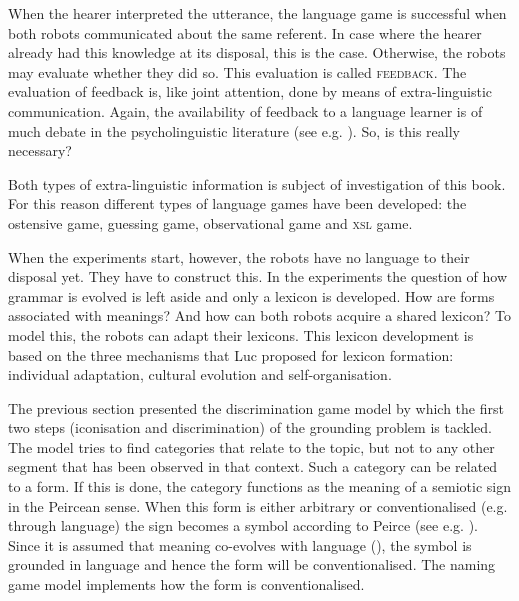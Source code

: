 When the hearer interpreted the utterance, the language game is successful when both robots communicated about the same referent. In case where the hearer already had this knowledge at its disposal, this is the case. Otherwise, the robots may evaluate whether they did so. This evaluation is called {\scshape feedback}. The evaluation of feedback is, like joint attention, done by means of extra-linguistic communication. Again, the availability of feedback to a language learner is of much debate in the psycholinguistic literature (see e.g. \citealt{bowerman:1988}). So, is this really necessary? 

Both types of extra-linguistic information is subject of investigation of this book. For this reason different types of language games have been developed: the ostensive game, guessing game, observational game and {\scshape xsl} game.

When the experiments start, however, the robots have no language to their disposal yet. They have to construct this. In the experiments the question of how grammar is evolved is left aside and only a lexicon is developed. How are forms associated with meanings? And how can both robots acquire a shared lexicon? To model this, the robots can adapt their lexicons. This lexicon development is based on the three mechanisms that Luc \citet{steels:1996a} proposed for lexicon formation: individual adaptation, cultural evolution and self-organisation.

The previous section presented the discrimination game model by which the first two steps (iconisation and discrimination) of the grounding problem is tackled. The model tries to find categories that relate to the topic, but not to any other segment that has been observed in that context. Such a category can be related to a form. If this is done, the category functions as the meaning of a semiotic sign in the Peircean sense. When this form is either arbitrary or conventionalised (e.g. through language) the sign becomes a symbol according to Peirce (see e.g. \citealt{chandler:1994}). Since it is assumed that meaning co-evolves with language (), the symbol is grounded in language and hence the form will be conventionalised. The naming game model implements how the form is conventionalised.

